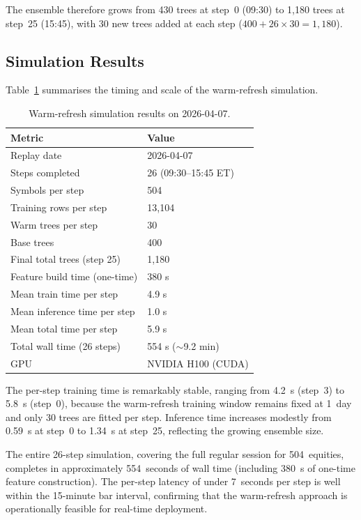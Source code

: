 \documentclass[conference]{IEEEtran}
\begin{document}
The ensemble therefore grows from 430 trees at step~0 (09:30) to 1{,}180 trees at step~25 (15:45), with 30 new trees added at each step ($400 + 26 \times 30 = 1{,}180$).

\subsection{Simulation Results}

Table~\ref{tab:simresults} summarises the timing and scale of the warm-refresh simulation.

\begin{table}[h]
\centering
\caption{Warm-refresh simulation results on 2026-04-07.}
\label{tab:simresults}
\begin{tabular}{ll}
\hline
\textbf{Metric} & \textbf{Value} \\
\hline
Replay date & 2026-04-07 \\
Steps completed & 26 (09:30--15:45 ET) \\
Symbols per step & 504 \\
Training rows per step & 13{,}104 \\
Warm trees per step & 30 \\
Base trees & 400 \\
Final total trees (step 25) & 1{,}180 \\
Feature build time (one-time) & 380 s \\
Mean train time per step & 4.9 s \\
Mean inference time per step & 1.0 s \\
Mean total time per step & 5.9 s \\
Total wall time (26 steps) & 554 s ($\sim$9.2 min) \\
GPU & NVIDIA H100 (CUDA) \\
\hline
\end{tabular}
\end{table}

The per-step training time is remarkably stable, ranging from 4.2~s (step~3) to 5.8~s (step~0), because the warm-refresh training window remains fixed at 1~day and only 30 trees are fitted per step. Inference time increases modestly from 0.59~s at step~0 to 1.34~s at step~25, reflecting the growing ensemble size.

The entire 26-step simulation, covering the full regular session for 504~equities, completes in approximately 554~seconds of wall time (including 380~s of one-time feature construction). The per-step latency of under 7~seconds per step is well within the 15-minute bar interval, confirming that the warm-refresh approach is operationally feasible for real-time deployment.
\end{document}
